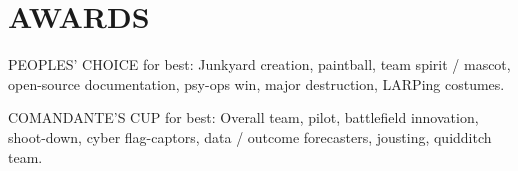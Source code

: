 \documentclass[10pt, letterpaper]{article}
\begin{document}
\section{AWARDS}
PEOPLES' CHOICE for best: Junkyard creation, paintball, team spirit / mascot, open-source documentation, psy-ops win, major destruction, LARPing costumes.

COMANDANTE'S CUP for best: Overall team, pilot, battlefield innovation, shoot-down, cyber flag-captors, data / outcome forecasters, jousting, quidditch team.
\fincols
\end{document}
